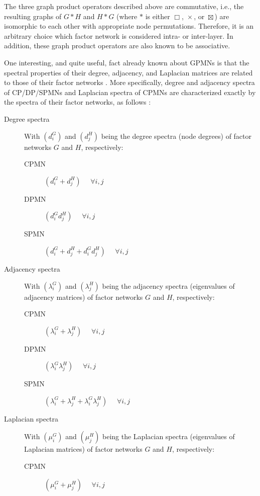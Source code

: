 \documentclass{article}
\DeclareMathOperator*{\CP}{\Box}
\DeclareMathOperator*{\DP}{\times}
\DeclareMathOperator*{\SP}{\boxtimes}
\begin{document}
The three graph product operators described above are commutative,
i.e., the resulting graphs of $G * H$ and $H * G$ (where $*$ is either
$\CP$, $\DP$, or $\SP$) are isomorphic to each other with appropriate
node permutations. Therefore, it is an arbitrary choice which factor
network is considered intra- or inter-layer. In addition, these graph
product operators are also known to be associative.

One interesting, and quite useful, fact already known about GPMNs is
that the spectral properties of their degree, adjacency, and Laplacian
matrices are related to those of their factor networks
\cite{macduffee1933theory,fiedler1973algebraic,sayama2016estimation}. More
specifically, degree and adjacency spectra of CP/DP/SPMNs and
Laplacian spectra of CPMNs are characterized exactly by the spectra of
their factor networks, as follows \cite{sayama2016estimation}:
\begin{description}
\item[Degree spectra] With $\left(d^G_i\right)$ and
  $\left(d^H_j\right)$ being the degree spectra (node degrees) of factor networks $G$
  and $H$, respectively:
\begin{description}
\item[CPMN] $\left(d^G_i + d^H_j\right)$ ~~$\forall i, j$
\item[DPMN] $\left(d^G_i d^H_j\right)$ ~~$\forall i, j$
\item[SPMN] $\left(d^G_i + d^H_j + d^G_i d^H_j\right)$ ~~$\forall i, j$ 
\end{description}
\item[Adjacency spectra] With $\left(\lambda^G_i\right)$ and
  $\left(\lambda^H_j\right)$ being the adjacency spectra (eigenvalues
  of adjacency matrices) of factor networks $G$ and $H$, respectively:
\begin{description}
\item[CPMN] $\left(\lambda^G_i + \lambda^H_j\right)$ ~~$\forall i, j$
\item[DPMN] $\left(\lambda^G_i \lambda^H_j\right)$ ~~$\forall i, j$
\item[SPMN] $\left(\lambda^G_i + \lambda^H_j + \lambda^G_i \lambda^H_j\right)$ ~~$\forall i, j$ 
\end{description}
\item[Laplacian spectra] With $\left(\mu^G_i\right)$ and
  $\left(\mu^H_j\right)$ being the Laplacian spectra (eigenvalues
  of Laplacian matrices) of factor networks $G$ and $H$, respectively:
\begin{description}
\item[CPMN] $\left(\mu^G_i + \mu^H_j\right)$ ~~$\forall i, j$
\end{description}
\end{description}
\end{document}
